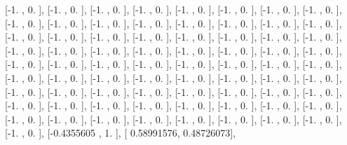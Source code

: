 \documentclass{article}
\begin{document}
       [-1.        ,  0.        ],
       [-1.        ,  0.        ],
       [-1.        ,  0.        ],
       [-1.        ,  0.        ],
       [-1.        ,  0.        ],
       [-1.        ,  0.        ],
       [-1.        ,  0.        ],
       [-1.        ,  0.        ],
       [-1.        ,  0.        ],
       [-1.        ,  0.        ],
       [-1.        ,  0.        ],
       [-1.        ,  0.        ],
       [-1.        ,  0.        ],
       [-1.        ,  0.        ],
       [-1.        ,  0.        ],
       [-1.        ,  0.        ],
       [-1.        ,  0.        ],
       [-1.        ,  0.        ],
       [-1.        ,  0.        ],
       [-1.        ,  0.        ],
       [-1.        ,  0.        ],
       [-1.        ,  0.        ],
       [-1.        ,  0.        ],
       [-1.        ,  0.        ],
       [-1.        ,  0.        ],
       [-1.        ,  0.        ],
       [-1.        ,  0.        ],
       [-1.        ,  0.        ],
       [-1.        ,  0.        ],
       [-1.        ,  0.        ],
       [-1.        ,  0.        ],
       [-1.        ,  0.        ],
       [-1.        ,  0.        ],
       [-1.        ,  0.        ],
       [-1.        ,  0.        ],
       [-1.        ,  0.        ],
       [-1.        ,  0.        ],
       [-1.        ,  0.        ],
       [-1.        ,  0.        ],
       [-1.        ,  0.        ],
       [-1.        ,  0.        ],
       [-1.        ,  0.        ],
       [-1.        ,  0.        ],
       [-1.        ,  0.        ],
       [-1.        ,  0.        ],
       [-1.        ,  0.        ],
       [-1.        ,  0.        ],
       [-1.        ,  0.        ],
       [-1.        ,  0.        ],
       [-1.        ,  0.        ],
       [-1.        ,  0.        ],
       [-1.        ,  0.        ],
       [-1.        ,  0.        ],
       [-1.        ,  0.        ],
       [-1.        ,  0.        ],
       [-1.        ,  0.        ],
       [-1.        ,  0.        ],
       [-1.        ,  0.        ],
       [-1.        ,  0.        ],
       [-1.        ,  0.        ],
       [-1.        ,  0.        ],
       [-1.        ,  0.        ],
       [-1.        ,  0.        ],
       [-1.        ,  0.        ],
       [-1.        ,  0.        ],
       [-1.        ,  0.        ],
       [-1.        ,  0.        ],
       [-1.        ,  0.        ],
       [-1.        ,  0.        ],
       [-1.        ,  0.        ],
       [-1.        ,  0.        ],
       [-1.        ,  0.        ],
       [-1.        ,  0.        ],
       [-0.4355605 ,  1.        ],
       [ 0.58991576,  0.48726073],
\end{document}
